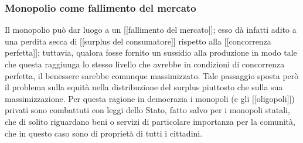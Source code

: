 \subsubsection{Monopolio come fallimento del mercato}

Il monopolio può dar luogo a un [[fallimento del mercato]]; esso dà infatti 
adito a una perdita secca di [[surplus del consumatore]] rispetto alla 
[[concorrenza perfetta]]; tuttavia, qualora fosse fornito un sussidio alla 
produzione in modo tale che questa raggiunga lo stesso livello che avrebbe in 
condizioni di concorrenza perfetta, il benessere sarebbe comunque massimizzato. 
Tale passaggio sposta però il problema sulla equità nella distribuzione del 
surplus piuttosto che sulla sua massimizzazione.
Per questa ragione in democrazia i monopoli (e gli [[oligopoli]]) privati sono 
combattuti con leggi dello Stato, fatto salvo per i monopoli statali, che di 
solito riguardano beni o servizi di particolare importanza per la comunità, che 
in questo caso sono di proprietà di tutti i cittadini.

% 
% 
% 
% 


